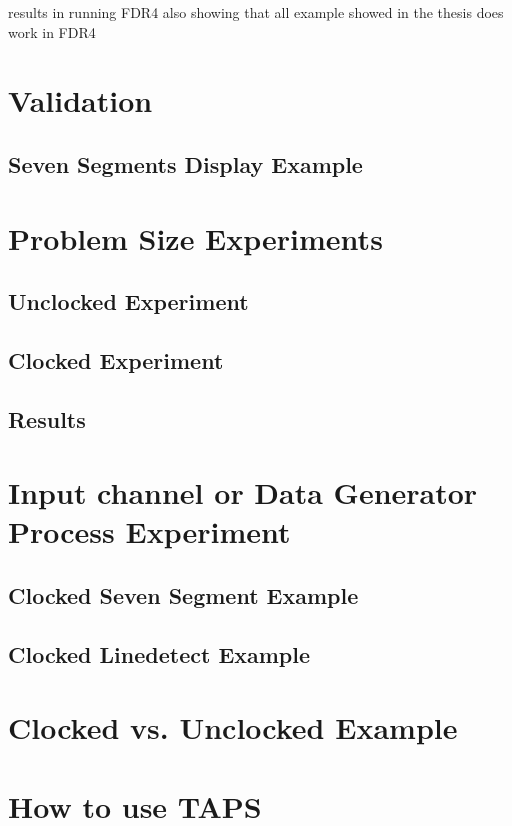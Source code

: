 results in running FDR4
also showing that all example showed in the thesis does work in FDR4

\section{Validation}

\subsection{Seven Segments Display Example}







\section{Problem Size Experiments}

\subsection{Unclocked Experiment}

\subsection{Clocked Experiment}

\subsection{Results}





\section{Input channel or Data Generator Process Experiment}

\subsection{Clocked Seven Segment Example}

\subsection{Clocked Linedetect Example}





\section{Clocked vs. Unclocked Example}




\section{How to use TAPS}
